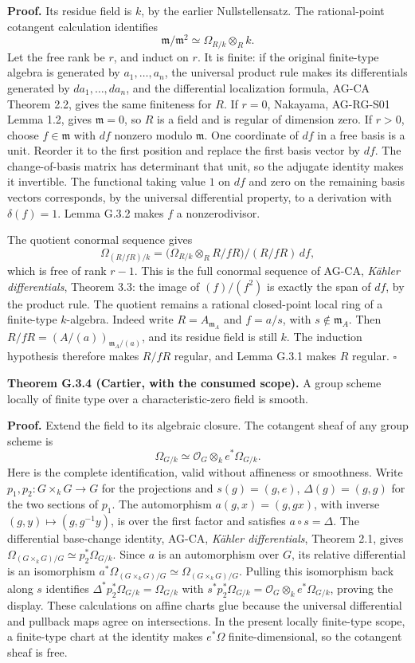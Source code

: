 \documentclass[11pt,a4paper,openany]{report}
\begin{document}
\textbf{Proof.} Its residue field is \(k\), by the earlier Nullstellensatz. The rational-point cotangent calculation identifies \[
\mathfrak m/\mathfrak m^2\simeq\Omega_{R/k}\otimes_R k.
\] Let the free rank be \(r\), and induct on \(r\). It is finite: if the original finite-type algebra is generated by \(a_1,\ldots,a_n\), the universal product rule makes its differentials generated by \(da_1,\ldots,da_n\), and the differential localization formula, AG-CA Theorem 2.2, gives the same finiteness for \(R\). If \(r=0\), Nakayama, AG-RG-S01 Lemma 1.2, gives \(\mathfrak m=0\), so \(R\) is a field and is regular of dimension zero. If \(r>0\), choose \(f\in\mathfrak m\) with \(df\) nonzero modulo \(\mathfrak m\). One coordinate of \(df\) in a free basis is a unit. Reorder it to the first position and replace the first basis vector by \(df\). The change-of-basis matrix has determinant that unit, so the adjugate identity makes it invertible. The functional taking value \(1\) on \(df\) and zero on the remaining basis vectors corresponds, by the universal differential property, to a derivation with \(\delta(f)=1\). Lemma G.3.2 makes \(f\) a nonzerodivisor.

The quotient conormal sequence gives \[
\Omega_{(R/fR)/k}
=\bigl(\Omega_{R/k}\otimes_RR/fR\bigr)/(R/fR)\,df,
\] which is free of rank \(r-1\). This is the full conormal sequence of AG-CA, \emph{Kähler differentials}, Theorem 3.3: the image of \((f)/(f^2)\) is exactly the span of \(df\), by the product rule. The quotient remains a rational closed-point local ring of a finite-type \(k\)-algebra. Indeed write \(R=A_{\mathfrak m_A}\) and \(f=a/s\), with \(s\notin\mathfrak m_A\). Then \(R/fR=(A/(a))_{\mathfrak m_A/(a)}\), and its residue field is still \(k\). The induction hypothesis therefore makes \(R/fR\) regular, and Lemma G.3.1 makes \(R\) regular. \(\square\)

\textbf{Theorem G.3.4 (Cartier, with the consumed scope).} A group scheme locally of finite type over a characteristic-zero field is smooth.

\textbf{Proof.} Extend the field to its algebraic closure. The cotangent sheaf of any group scheme is \[
\Omega_{G/k}\simeq\mathcal O_G\otimes_k e^*\Omega_{G/k}.
\] Here is the complete identification, valid without affineness or smoothness. Write \(p_1,p_2:G\times_kG\to G\) for the projections and \(s(g)=(g,e)\), \(\Delta(g)=(g,g)\) for the two sections of \(p_1\). The automorphism \(a(g,x)=(g,gx)\), with inverse \((g,y)\mapsto(g,g^{-1}y)\), is over the first factor and satisfies \(a\circ s=\Delta\). The differential base-change identity, AG-CA, \emph{Kähler differentials}, Theorem 2.1, gives \(\Omega_{(G\times_kG)/G}\simeq p_2^*\Omega_{G/k}\). Since \(a\) is an automorphism over \(G\), its relative differential is an isomorphism \(a^*\Omega_{(G\times_kG)/G}\simeq\Omega_{(G\times_kG)/G}\). Pulling this isomorphism back along \(s\) identifies \(\Delta^*p_2^*\Omega_{G/k}=\Omega_{G/k}\) with \(s^*p_2^*\Omega_{G/k}=\mathcal O_G\otimes_k e^*\Omega_{G/k}\), proving the display. These calculations on affine charts glue because the universal differential and pullback maps agree on intersections. In the present locally finite-type scope, a finite-type chart at the identity makes \(e^*\Omega\) finite-dimensional, so the cotangent sheaf is free.
\end{document}
